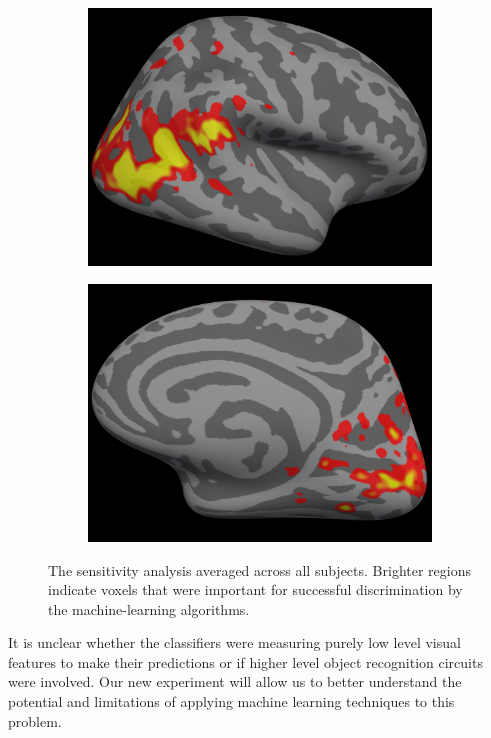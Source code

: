 \documentclass[12pt]{article}
\begin{document}
\begin{figure}
\begin{subfigure}{0.4\textwidth}
\includegraphics[width=\textwidth]{figures/rh-lateral-smax-average}
\caption{}
\label{fig:rh-lateral-smax-average}
\end{subfigure}
\begin{subfigure}{0.4\textwidth}
\centering
\includegraphics[width=\textwidth]{figures/rh-medial-smax-average}
\caption{}
\label{fig:rh-medial-smax-average}
\end{subfigure}
\caption{The sensitivity analysis averaged across all subjects.
Brighter regions indicate voxels that were important for successful discrimination by the machine-learning algorithms.}
\label{fig:preliminary-data-sensitivity}
\end{figure}
It is unclear whether the classifiers were measuring purely low level visual features to make their predictions or if higher level object recognition circuits were involved.
Our new experiment will allow us to better understand the potential and limitations of applying machine learning techniques to this problem.
\end{document}
